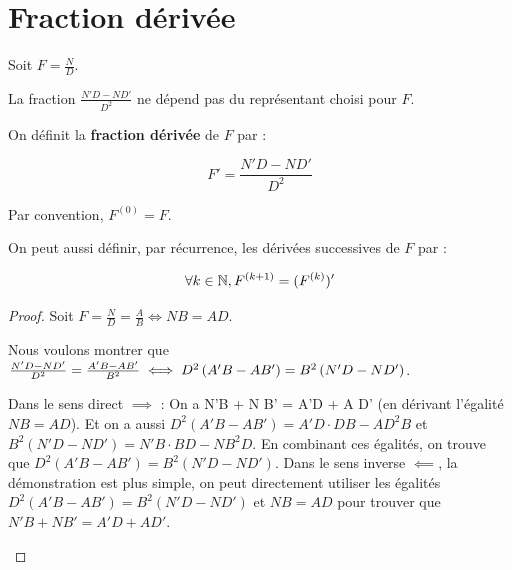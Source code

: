 \documentclass[12pt, a4paper]{report}
\begin{document}
\section{Fraction dérivée}

\begin{property}
    Soit $F = \frac ND$.

    La fraction $\frac{N'D - ND'}{D^2}$ ne dépend pas du représentant choisi pour $F$.
\end{property}

\begin{definition}
    On définit la \textbf{fraction dérivée} de $F$ par :

    $$F' = \frac{N'D - ND'}{D^2}$$

    Par convention, $F^{(0)} = F$.

    On peut aussi définir, par récurrence, les dérivées successives de $F$ par :

    $$\forall k \in \mathbb{N}, F^{(k+1)} = (F^{(k)})'$$
\end{definition}

\begin{proof}
    Soit $F = \frac ND = \frac AB \iff NB = AD$.

    Nous voulons montrer que $\frac{N'D - ND'}{D^2} = \frac{A'B - AB'}{B^2} \iff D^2\left(A'B-AB'\right) = B^2\left(N'D - ND'\right)$.

    \begin{outline}
        \1 Dans le sens direct $\implies$ :
        \2 On a N'B + N B' = A'D + A D' (en dérivant l'égalité $NB = AD$).
        \2 Et on a aussi $D^2(A'B - AB') = A'D\cdot DB - AD^2 B$ et $B^2(N'D - ND') = N'B\cdot BD - NB^2 D$.
        \2 En combinant ces égalités, on trouve que $D^2(A'B - AB') = B^2(N'D - ND')$.
        \1 Dans le sens inverse $\impliedby$, la démonstration est plus simple, on peut directement utiliser les égalités $D^2(A'B - AB') = B^2(N'D - ND')$ et $NB = AD$ pour trouver que $N'B + N B' = A'D + A D'$.
    \end{outline}
\end{proof}
\end{document}

